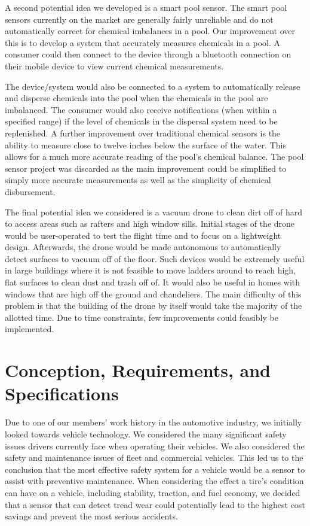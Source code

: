 \documentclass[11pt]{IEEEtran}
\begin{document}
		A second potential idea we developed is a smart pool sensor. The smart pool sensors currently on the market are generally fairly unreliable and do not automatically correct for chemical imbalances in a pool. Our improvement over this is to develop a system that accurately measures chemicals in a pool. A consumer could then connect to the device through a bluetooth connection on their mobile device to view current chemical measurements. 

		The device/system would also be connected to a system to automatically release and disperse chemicals into the pool when the chemicals in the pool are imbalanced. The consumer would also receive notifications (when within a specified range) if the level of chemicals in the dispersal system need to be replenished. A further improvement over traditional chemical sensors is the ability to measure close to twelve inches below the surface of the water. This allows for a much more accurate reading of the pool’s chemical balance. The pool sensor project was discarded as the main improvement could be simplified to simply more accurate measurements as well as the simplicity of chemical disbursement. 

		The final potential idea we considered is a vacuum drone to clean dirt off of hard to access areas such as rafters and high window sills. Initial stages of the drone would be user-operated to test the flight time and to focus on a lightweight design. Afterwards, the drone would be made autonomous to automatically detect surfaces to vacuum off of the floor. Such devices would be extremely useful in large buildings where it is not feasible to move ladders around to reach high, flat surfaces to clean dust and trash off of. It would also be useful in homes with windows that are high off the ground and chandeliers. The main difficulty of this problem is that the building of the drone by itself would take the majority of the allotted time. Due to time constraints, few improvements could feasibly be implemented. 


	\section{Conception, Requirements, and Specifications}
		Due to one of our members’ work history in the automotive industry, we initially looked towards vehicle technology. We considered the many significant safety issues drivers currently face when operating their vehicles. We also considered the safety and maintenance issues of fleet and commercial vehicles. This led us to the conclusion that the most effective safety system for a vehicle would be a sensor to assist with preventive maintenance. When considering the effect a tire’s condition can have on a vehicle, including stability, traction, and fuel economy, we decided that a sensor that can detect tread wear could potentially lead to the highest cost savings and prevent the most serious accidents.
\end{document}
